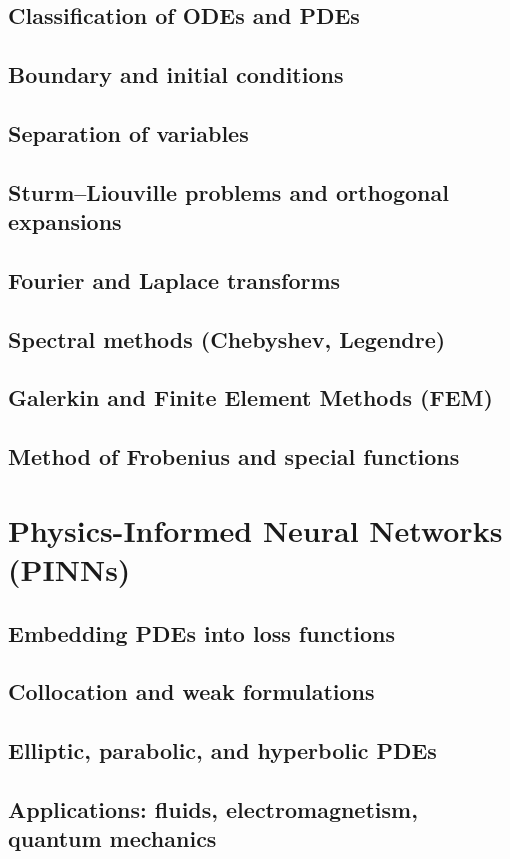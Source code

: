 \section{Classification of ODEs and PDEs}
\section{Boundary and initial conditions}
\section{Separation of variables}
\section{Sturm–Liouville problems and orthogonal expansions}
\section{Fourier and Laplace transforms}
\section{Spectral methods (Chebyshev, Legendre)}
\section{Galerkin and Finite Element Methods (FEM)}
\section{Method of Frobenius and special functions}

\chapter{Physics-Informed Neural Networks (PINNs)}
\section{Embedding PDEs into loss functions}
\section{Collocation and weak formulations}
\section{Elliptic, parabolic, and hyperbolic PDEs}
\section{Applications: fluids, electromagnetism, quantum mechanics}
